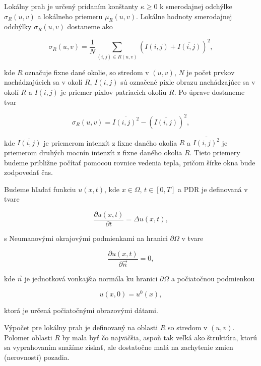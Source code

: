 \documentclass[a4paper,11pt,oneside]{article}%
\begin{document}
Lokálny prah je určený pridaním konštanty $\kappa \geq 0$ k smerodajnej odchýlke $\sigma_R(u,v)$ a lokálneho priemeru $\mu_R(u,v)$. Lokálne hodnoty smerodajnej odchýlky $\sigma_R(u,v)$ dostaneme ako 

\begin{equation} 
\sigma_R(u,v) = \frac{1}{N} \sum_{(i,j) \in R(u,v)} (I(i,j) + \overline{I(i,j)})^2,
\end{equation}

kde $R$ označuje fixne dané okolie, so stredom v $(u,v)$, $N$ je počet prvkov nachádzajúcich sa v okolí $R$, $I(i,j)$ sú označené pixle obrazu nachádzajúce sa v okolí $R$ a $\overline{I(i,j)}$ je priemer pixlov patriacich okoliu $R$. Po úprave dostaneme tvar

\begin{equation} 
\sigma_R(u,v) = \overline{I(i,j)^2} - (\overline{I(i,j)})^2,
\end{equation}

kde $\overline{I(i,j)}$ je priemerom intenzít z fixne daného okolia $R$ a $\overline{I(i,j)^2}$ je priemerom druhých mocnín intenzít z fixne daného okolia $R$. Tieto priemery budeme približne počítať pomocou rovnice vedenia tepla, pričom šírke okna bude zodpovedať čas. 

Budeme hľadať funkciu $u(x, t)$, kde $x \in \Omega$, $t \in [0, T]$ a PDR je definovaná v tvare

\begin{equation}
\frac{\partial u(x, t)}{\partial t} = \Delta u(x,t),
\end{equation}

s Neumanovými okrajovými podmienkami na hranici $\partial \Omega$ v tvare

\begin{equation}
\frac{\partial u(x, t)}{\partial \vec{n}} = 0,
\end{equation}

kde $\vec{n}$ je jednotková vonkajšia normála ku hranici $\partial \Omega$ a počiatočnou podmienkou 

\begin{equation}
u(x, 0) = u^0(x),
\end{equation}

ktorá je určená počiatočnými obrazovými dátami.

Výpočet pre lokálny prah je definovaný na oblasti $R$ so stredom v $(u, v)$. Polomer oblasti $R$ by mala byť čo najväčšia, aspoň tak veľká ako štruktúra, ktorú sa vyprahovaním snažíme získať, ale dostatočne malá na zachytenie zmien (nerovností) pozadia.
\end{document}

